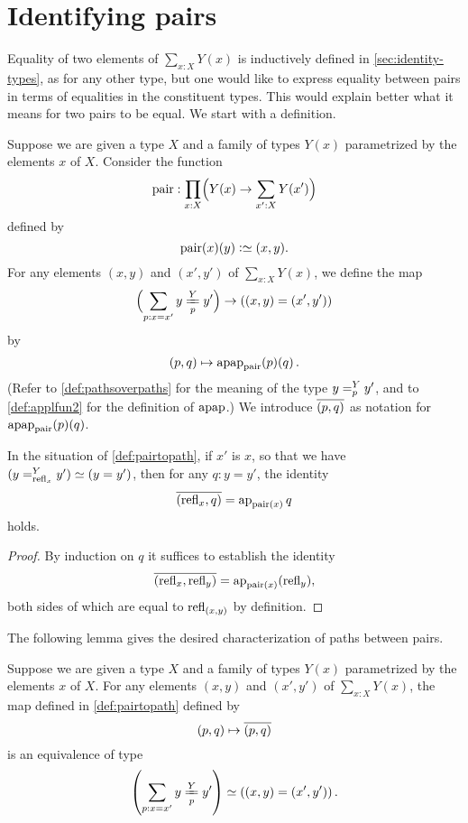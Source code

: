 \section{Identifying pairs}\label{sec:pairpaths}

Equality of two elements of $\sum _{x:X} Y(x)$ is inductively defined in \cref{sec:identity-types}, as for any other type, but
one would like to express equality between pairs in terms of equalities in the constituent types.  This would explain better what it means for
two pairs to be equal.  We start with a definition.

\begin{definition}\label{def:pairtopath}
  Suppose we are given a type $X$ and a family of types $Y(x)$ parametrized by the elements $x$ of $X$.
  Consider the function
  \[
    \pair : \prod_{x:X} \Bigl( Y(x) \to \sum _{x':X} Y(x') \Bigr)
  \]
  defined by
  \[
    \pair(x)(y) \defeq (x,y).
  \]
  For any elements $(x,y)$ and $(x',y')$ of $\sum _{x:X} Y(x)$, we define the map 
  \[
    \Bigl( \sum_{p:x=x'} \pathover y Y p {y'} \Bigr)
    \to \left ( (x,y) = (x',y') \right )
  \]
  by
  \[
    (p,q) \mapsto \apap {\pair} p q.
  \]
  (Refer to \cref{def:pathsoverpaths} for the meaning of the type $\pathover y Y p {y'}$, and to \cref{def:applfun2} for the definition of $\mathrm{apap}$.)
  We introduce $\overline{({p},{q})}$ as notation for $\apap {\pair} p q$.
\end{definition}

\begin{lemma}\label{cor:isEq-pair=}
  In the situation of \cref{def:pairtopath}, if $x'$ is $x$,
  so that we have $( \pathover y Y {\refl x} {y'} ) \jdeq ( y = y' )$,
  then for any $q : y = y'$, the identity
  \[
    \pathpair {\refl x} q = \ap {\pair (x)} q
  \]
  holds.
\end{lemma}

\begin{proof}
  By induction on $q$ it suffices to establish the identity
  \[
    \pathpair {\refl x} {\refl y} = \ap {\pair (x)} (\refl y),
  \]
  both sides of which are
  equal to $\mathrm{refl}_{(x,y)}$ by definition.
\end{proof}

The following lemma gives the desired characterization of paths between pairs.

\begin{lemma}\label{lem:isEq-pair=}
  Suppose we are given a type $X$ and a family of types $Y(x)$ parametrized by the elements $x$ of $X$.
  For any elements $(x,y)$ and $(x',y')$ of $\sum _{x:X} Y(x)$,
  the map defined in \cref{def:pairtopath} defined by
  \[
    (p,q) \mapsto \overline{({p},{q})}
  \]
  is an equivalence of type
  \[
    \left( \sum_{p:x=x'} \pathover y Y p {y'} \right)
    \weq \left ( (x,y) = (x',y') \right ).
  \]
\end{lemma}

